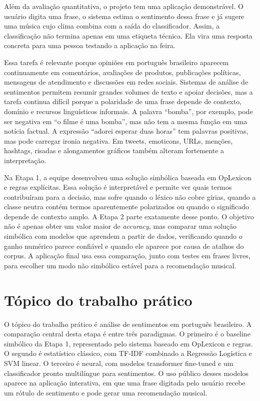 \documentclass[11pt,a4paper]{article}
\begin{document}
Além da avaliação quantitativa, o projeto tem uma aplicação demonstrável. O usuário digita uma frase, o sistema estima o sentimento dessa frase e já sugere uma música cujo clima combina com a saída do classificador. Assim, a classificação não termina apenas em uma etiqueta técnica. Ela vira uma resposta concreta para uma pessoa testando a aplicação na feira.

Essa tarefa é relevante porque opiniões em português brasileiro aparecem continuamente em comentários, avaliações de produtos, publicações políticas, mensagens de atendimento e discussões em redes sociais. Sistemas de análise de sentimentos permitem resumir grandes volumes de texto e apoiar decisões, mas a tarefa continua difícil porque a polaridade de uma frase depende de contexto, domínio e recursos linguísticos informais. A palavra ``bomba'', por exemplo, pode ser negativa em ``o filme é uma bomba'', mas não tem a mesma função em uma notícia factual. A expressão ``adorei esperar duas horas'' tem palavras positivas, mas pode carregar ironia negativa. Em tweets, emoticons, URLs, menções, hashtags, risadas e alongamentos gráficos também alteram fortemente a interpretação.

Na Etapa 1, a equipe desenvolveu uma solução simbólica baseada em OpLexicon e regras explícitas. Essa solução é interpretável e permite ver quais termos contribuíram para a decisão, mas sofre quando o léxico não cobre gírias, quando a classe neutra contém termos aparentemente polarizados ou quando o significado depende de contexto amplo. A Etapa 2 parte exatamente desse ponto. O objetivo não é apenas obter um valor maior de \emph{accuracy}, mas comparar uma solução simbólica com modelos que aprendem a partir de dados, verificando quando o ganho numérico parece confiável e quando ele aparece por causa de atalhos do corpus. A aplicação final usa essa comparação, junto com testes em frases livres, para escolher um modo não simbólico estável para a recomendação musical.

\section{Tópico do trabalho prático}

O tópico do trabalho prático é análise de sentimentos em português brasileiro. A comparação central desta etapa é entre três paradigmas. O primeiro é o baseline simbólico da Etapa 1, representado pelo sistema baseado em OpLexicon e regras. O segundo é estatístico clássico, com TF-IDF combinado a Regressão Logística e SVM linear. O terceiro é neural, com modelos transformer fine-tuned e um classificador pronto multilíngue para sentimentos. O uso público desses modelos aparece na aplicação interativa, em que uma frase digitada pelo usuário recebe um rótulo de sentimento e pode gerar uma recomendação musical.
\end{document}
